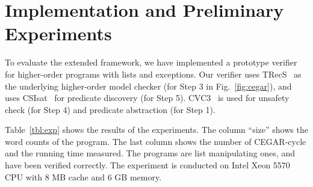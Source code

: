 \section{Implementation and Preliminary Experiments}
\label{sec:experiments}

To evaluate the extended framework, we have implemented a prototype
verifier for higher-order programs with lists and exceptions.
Our verifier uses TRecS~\cite{KobayashiPOPL2009,KobayashiPPDP2009} as
the underlying higher-order model checker (for Step 3 in
Fig.~\ref{fig:cegar}), and uses CSIsat~\cite{Beyer2008} for predicate
discovery (for Step 5).  CVC3~\cite{Barrett2007} is used for unsafety
check (for Step 4) and predicate abstraction (for Step 1).

Table~\ref{tbl:exp} shows the results of the experiments.
The column ``size'' shows the word counts of the program.
The last column shows the number of CEGAR-cycle and the running time measured.
The programs are list manipulating ones, and have been verified correctly.
The experiment is conducted on Intel Xeon 5570 CPU with 8 MB cache and 6 GB memory.

